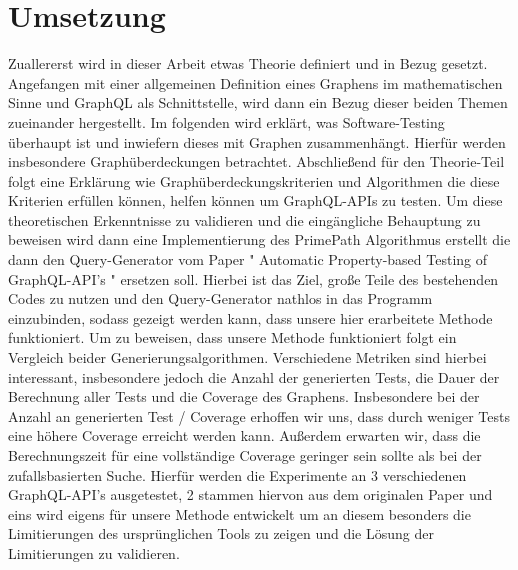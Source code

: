 \section{Umsetzung}

Zuallererst wird in dieser Arbeit etwas Theorie definiert und in Bezug gesetzt.
Angefangen mit einer allgemeinen Definition eines Graphens im mathematischen Sinne und GraphQL als Schnittstelle, wird dann ein Bezug dieser beiden Themen
zueinander hergestellt.
Im folgenden wird erklärt, was Software-Testing überhaupt ist und inwiefern dieses mit Graphen zusammenhängt.
Hierfür werden insbesondere Graphüberdeckungen betrachtet.
Abschließend für den Theorie-Teil folgt eine Erklärung wie Graphüberdeckungskriterien und Algorithmen die diese Kriterien
erfüllen können, helfen können um GraphQL-APIs zu testen.
Um diese theoretischen Erkenntnisse zu validieren und die eingängliche Behauptung zu beweisen wird dann eine Implementierung
des PrimePath Algorithmus erstellt die dann den Query-Generator vom Paper " Automatic Property-based Testing of GraphQL-API's " ersetzen soll.
Hierbei ist das Ziel, große Teile des bestehenden Codes zu nutzen und den Query-Generator nathlos in das Programm einzubinden, sodass
gezeigt werden kann, dass unsere hier erarbeitete Methode funktioniert.
Um zu beweisen, dass unsere Methode funktioniert folgt ein Vergleich beider Generierungsalgorithmen.
Verschiedene Metriken sind hierbei interessant, insbesondere jedoch die Anzahl der generierten Tests, die Dauer
der Berechnung aller Tests und die Coverage des Graphens.
Insbesondere bei der Anzahl an generierten Test / Coverage erhoffen wir uns, dass durch weniger Tests eine höhere Coverage erreicht werden
kann. Außerdem erwarten wir, dass die Berechnungszeit für eine vollständige Coverage geringer sein sollte als bei der zufallsbasierten Suche.
Hierfür werden die Experimente an 3 verschiedenen GraphQL-API's ausgetestet, 2 stammen hiervon aus dem originalen Paper und eins wird
eigens für unsere Methode entwickelt um an diesem besonders die Limitierungen des ursprünglichen Tools zu zeigen und die Lösung der Limitierungen zu validieren.




